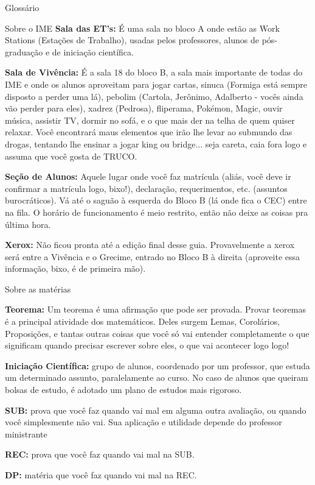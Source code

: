 \begin{secao}{Glossário}
\begin{subsecao}{Sobre o IME}
{\bf Sala das ET's:} É uma sala no bloco A onde estão as Work
Stations (Estações de Trabalho), usadas pelos professores, alunos de
pós-graduação e de iniciação científica.

{\bf Sala de Vivência:} É a sala 18 do bloco B, a sala mais importante de todas
do IME e onde os alunos aproveitam para jogar cartas, sinuca (Formiga está
sempre disposto a perder uma lá), pebolim (Cartola, Jerônimo, Adalberto - vocês
ainda vão perder para eles), xadrez (Pedrosa), fliperama, Pokémon, Magic, ouvir
música, assistir TV, dormir no sofá, e o que mais der na telha de quem quiser
relaxar. Você encontrará maus elementos que irão lhe levar ao submundo das
drogas, tentando lhe ensinar a jogar king ou bridge... seja careta, caia fora
logo e assuma que você gosta de TRUCO.

{\bf Seção de Alunos:} Aquele lugar onde você faz matrícula (aliás, você deve ir
confirmar a matrícula logo, bixo!), declaração, requerimentos, etc. (assuntos
burocráticos). Vá até o saguão à esquerda do Bloco B (lá onde fica o CEC) entre
na fila. O horário de funcionamento é meio restrito, então não deixe as coisas
pra última hora.

{\bf Xerox:} Não ficou pronta até a edição final desse guia. Provavelmente a
xerox será entre a Vivência e o Grecime, entrado no Bloco B à
direita (aproveite essa informação, bixo, é de primeira mão).

\end{subsecao}

\begin{subsecao}{Sobre as matérias}

{\bf Teorema:} Um teorema é uma afirmação que pode ser provada. Provar
teoremas é a principal atividade dos matemáticos. Deles surgem Lemas,
Corolários, Proposições, e tantas outras coisas que você só vai entender
completamente o que significam quando precisar escrever sobre eles, o que vai
acontecer logo logo!

{\bf Iniciação Científica:} grupo de alunos, coordenado por um professor, que
estuda um determinado assunto, paralelamente ao curso. No caso de alunos que
queiram bolsas de estudo, é adotado um plano de estudos mais rigoroso.

{\bf SUB:} prova que você faz quando vai mal em alguma outra avaliação, ou
quando você simplesmente não vai. Sua aplicação e utilidade depende do
professor ministrante

{\bf REC:} prova que você faz quando vai mal na SUB.

{\bf DP:} matéria que você faz quando vai mal na REC.
\end{subsecao}


\end{secao}
